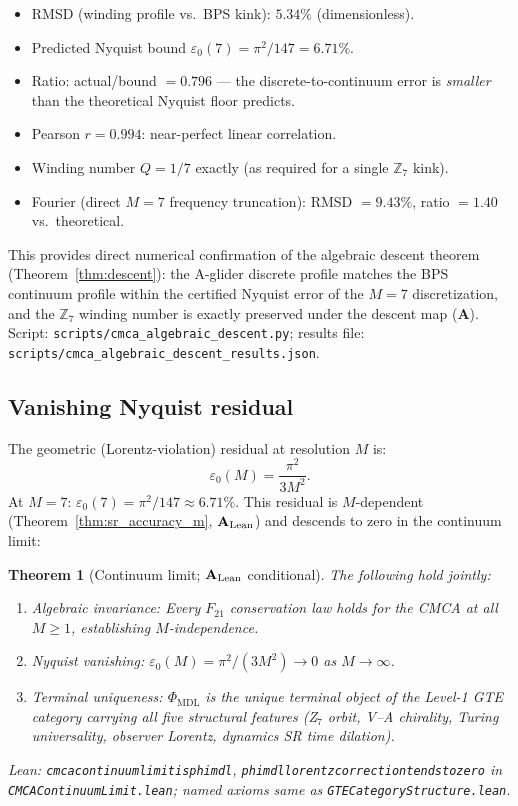\documentclass[11pt]{article}
\newtheorem{theorem}{Theorem}[section]
\theoremstyle{remark}
\newcommand{\PHIMDL}{\Phi_{\mathrm{MDL}}}
\newcommand{\ZS}{\mathbb{Z}_7}
\newcommand{\lean}[1]{%
  \penalty-100
  \begingroup\def\_{\textunderscore\allowbreak}\texttt{#1}\endgroup}
\newcommand{\epsz}{\varepsilon_0}
\newcommand{\CatA}{\textbf{A}}
\newcommand{\CatAL}{\ensuremath{\textbf{A}_{\rm Lean}}}
\begin{document}
\begin{itemize}[noitemsep]
  \item RMSD (winding profile vs.\ BPS kink): $5.34\%$ (dimensionless).
  \item Predicted Nyquist bound $\epsz(7) = \pi^2/147 = 6.71\%$.
  \item Ratio: actual/bound $= 0.796$ --- the discrete-to-continuum error is
    \emph{smaller} than the theoretical Nyquist floor predicts.
  \item Pearson $r = 0.994$: near-perfect linear correlation.
  \item Winding number $Q = 1/7$ exactly (as required for a single $\ZS$ kink).
  \item Fourier (direct $M=7$ frequency truncation): RMSD $= 9.43\%$, ratio $= 1.40$ vs.\ theoretical.
\end{itemize}

This provides direct numerical confirmation of the algebraic descent theorem
(Theorem~\ref{thm:descent}): the A-glider discrete profile matches the BPS continuum
profile within the certified Nyquist error of the $M=7$ discretization, and the
$\ZS$ winding number is exactly preserved under the descent map ($\CatA$).
Script: \texttt{scripts/cmca\_algebraic\_descent.py}; results file:
\texttt{scripts/cmca\_algebraic\_descent\_results.json}.

\subsection{Vanishing Nyquist residual}
\label{ssec:nyquist}

The geometric (Lorentz-violation) residual at resolution $M$ is:
\begin{equation}
  \epsz(M) = \frac{\pi^2}{3M^2}.
  \label{eq:residual}
\end{equation}
At $M=7$: $\epsz(7)=\pi^2/147\approx 6.71\%$.  This residual is
$M$-dependent (Theorem~\ref{thm:sr_accuracy_m}, $\CatAL$) and descends
to zero in the continuum limit:

\begin{theorem}[Continuum limit; $\CatAL$ conditional]
  \label{thm:continuum}
  The following hold jointly:
  \begin{enumerate}[noitemsep,label=(\roman*)]
    \item \textit{Algebraic invariance:} Every $F_{21}$ conservation law holds
      for the CMCA at all $M\geq 1$, establishing $M$-independence.
    \item \textit{Nyquist vanishing:} $\epsz(M) = \pi^2/(3M^2)\to 0$ as $M\to\infty$.
    \item \textit{Terminal uniqueness:} $\PHIMDL$ is the unique terminal object
      of the Level-1 GTE category carrying all five structural features
      (Z$_7$ orbit, V--A chirality, Turing universality, observer Lorentz,
      dynamics SR time dilation).
  \end{enumerate}
  Lean: \lean{cmca\_continuum\_limit\_is\_phimdl},
  \lean{phimdl\_lorentz\_correction\_tendsto\_zero} in
  \lean{CMCAContinuumLimit.lean};
  named axioms same as \lean{GTECategoryStructure.lean}.
\end{theorem}
\end{document}
